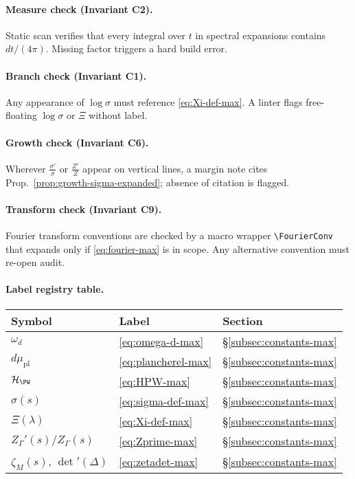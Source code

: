 \paragraph{Measure check (Invariant C2).}
Static scan verifies that every integral over $t$ in spectral expansions contains $dt/(4\pi)$. Missing factor triggers a hard build error.

\paragraph{Branch check (Invariant C1).}
Any appearance of $\log\sigma$ must reference \eqref{eq:Xi-def-max}. A linter flags free-floating $\log\sigma$ or $\Xi$ without label.

\paragraph{Growth check (Invariant C6).}
Wherever $\frac{\sigma'}{\sigma}$ or $\frac{Z'}{Z}$ appear on vertical lines, a margin note cites Prop.~\ref{prop:growth-sigma-expanded}; absence of citation is flagged.

\paragraph{Transform check (Invariant C9).}
Fourier transform conventions are checked by a macro wrapper \verb|\FourierConv| that expands only if \eqref{eq:fourier-max} is in scope. Any alternative convention must re-open audit.

\paragraph{Label registry table.}
\begin{center}
\renewcommand{\arraystretch}{1.15}
\begin{tabular}{lll}
\toprule
\textbf{Symbol} & \textbf{Label} & \textbf{Section} \\
\midrule
$\omega_d$ & \eqref{eq:omega-d-max} & \S\ref{subsec:constants-max} \\
$d\mu_{\mathrm{pl}}$ & \eqref{eq:plancherel-max} & \S\ref{subsec:constants-max} \\
$\mathcal H_{\PW}$ & \eqref{eq:HPW-max} & \S\ref{subsec:constants-max} \\
$\sigma(s)$ & \eqref{eq:sigma-def-max} & \S\ref{subsec:constants-max} \\
$\Xi(\lambda)$ & \eqref{eq:Xi-def-max} & \S\ref{subsec:constants-max} \\
$Z_\Gamma'(s)/Z_\Gamma(s)$ & \eqref{eq:Zprime-max} & \S\ref{subsec:constants-max} \\
$\zeta_M(s)$, $\det{}'(\Delta)$ & \eqref{eq:zetadet-max} & \S\ref{subsec:constants-max} \\
\bottomrule
\end{tabular}
\end{center}

